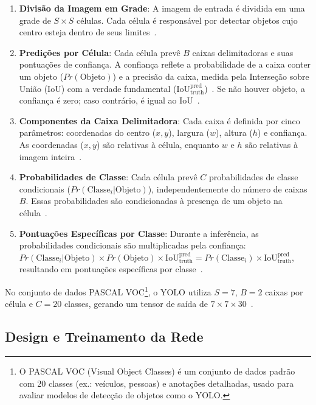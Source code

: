 \documentclass[journal,transmag]{IEEEtran}
\begin{document}
\begin{enumerate}
	\item \textbf{Divisão da Imagem em Grade}: A imagem de entrada é dividida em uma grade de \( S \times S \) células. Cada célula é responsável por detectar objetos cujo centro esteja dentro de seus limites~\cite{Redmon2015}.
	\item \textbf{Predições por Célula}: Cada célula prevê \( B \) caixas delimitadoras e suas pontuações de confiança. A confiança reflete a probabilidade de a caixa conter um objeto (\( Pr(\text{Objeto}) \)) e a precisão da caixa, medida pela Interseção sobre União (IoU) com a verdade fundamental (\( \text{IoU}_{\text{truth}}^{\text{pred}} \))~\cite{Redmon2015}. Se não houver objeto, a confiança é zero; caso contrário, é igual ao IoU~\cite{Redmon2015}.
	\item \textbf{Componentes da Caixa Delimitadora}: Cada caixa é definida por cinco parâmetros: coordenadas do centro (\( x, y \)), largura (\( w \)), altura (\( h \)) e confiança. As coordenadas (\( x, y \)) são relativas à célula, enquanto \( w \) e \( h \) são relativas à imagem inteira~\cite{Redmon2015}.
	\item \textbf{Probabilidades de Classe}: Cada célula prevê \( C \) probabilidades de classe condicionais (\( Pr(\text{Classe}_i|\text{Objeto}) \)), independentemente do número de caixas \( B \). Essas probabilidades são condicionadas à presença de um objeto na célula~\cite{Redmon2015}.
	\item \textbf{Pontuações Específicas por Classe}: Durante a inferência, as probabilidades condicionais são multiplicadas pela confiança: \( Pr(\text{Classe}_i|\text{Objeto}) \times Pr(\text{Objeto}) \times \text{IoU}_{\text{truth}}^{\text{pred}} = Pr(\text{Classe}_i) \times \text{IoU}_{\text{truth}}^{\text{pred}} \), resultando em pontuações específicas por classe~\cite{Redmon2015}.
\end{enumerate}

No conjunto de dados PASCAL VOC\footnote{O PASCAL VOC (Visual Object Classes) é um conjunto de dados padrão com 20 classes (ex.: veículos, pessoas) e anotações detalhadas, usado para avaliar modelos de detecção de objetos como o YOLO.}, o YOLO utiliza \( S = 7 \), \( B = 2 \) caixas por célula e \( C = 20 \) classes, gerando um tensor de saída de \( 7 \times 7 \times 30 \)~\cite{Redmon2015}.

\subsection{Design e Treinamento da Rede}
\end{document}
